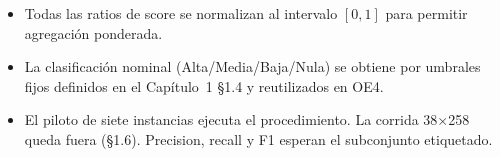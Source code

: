\begin{itemize}
  \item Todas las ratios de score se normalizan al intervalo $[0, 1]$ para permitir agregación
        ponderada.
  \item La clasificación nominal (Alta/Media/Baja/Nula) se obtiene por umbrales fijos definidos en
        el Capítulo~1 §1.4 y reutilizados en OE4.
  \item El piloto de siete instancias ejecuta el procedimiento. La corrida 38$\times$258 queda
        fuera (§1.6). Precision, recall y F1 esperan el subconjunto etiquetado.
\end{itemize}
